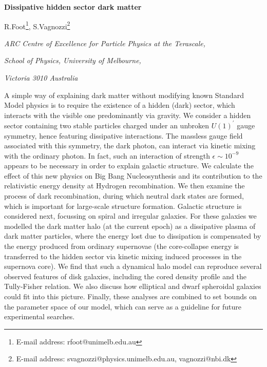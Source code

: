\documentclass[12pt]{article}
\begin{document}

\renewcommand{\arraystretch}{2}

\begin{titlepage}
\vskip 2cm
\centerline{\Large \bf
Dissipative hidden sector dark matter}

\vskip 2.2cm
\centerline{\large R.Foot\footnote{E-mail address:
rfoot@unimelb.edu.au}, S.Vagnozzi\footnote{
E-mail address: svagnozzi@physics.unimelb.edu.au, vagnozzi@nbi.dk}}


\vskip 0.7cm
\centerline{\it ARC Centre of Excellence for Particle Physics at the
Terascale,}
\centerline{\it School of Physics, University of Melbourne,}
\centerline{\it Victoria 3010 Australia}
\vskip 2cm
\noindent

A simple way of explaining dark matter without modifying known Standard
Model physics is to require the existence of a hidden (dark) sector, 
which interacts with the visible one predominantly via gravity. We
consider a hidden sector containing two stable particles charged 
under an unbroken $U(1)^{'}$ gauge symmetry, hence featuring dissipative
interactions. The massless gauge field associated with 
this symmetry, the dark photon, can interact via kinetic mixing with the
ordinary photon. In fact, such an interaction of strength $\epsilon \sim
10 ^{-9}$ appears to 
be necessary in order to explain galactic structure. We calculate the
effect of this new physics on Big Bang Nucleosynthesis and its 
contribution to the relativistic energy density at Hydrogen
recombination. 
We then examine the process of dark recombination, during which neutral
dark states are formed, which is important for large-scale structure
formation. 
Galactic structure is considered next, focussing on spiral and irregular
galaxies. For these galaxies we modelled the dark matter halo (at the
current epoch) as
a dissipative plasma of dark matter particles, where the energy lost due
to dissipation is compensated by the energy
produced from ordinary supernovae (the core-collapse energy is
transferred to the hidden sector via kinetic mixing induced
processes in the supernova core).  
We find that such a dynamical halo model can reproduce several observed 
features of disk galaxies, including the cored density profile and the
Tully-Fisher relation. 
We also discuss how elliptical and dwarf spheroidal galaxies could fit
into this picture.
Finally, these analyses are combined to set bounds on the parameter
space of our model, which can serve as a guideline for future
experimental searches.

 \end{titlepage}
 
\end{document}
